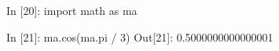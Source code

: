 \documentclass{magnolia}
\begin{document}
\begin{pythoncode}
In [20]: import math as ma

In [21]: ma.cos(ma.pi / 3)
Out[21]: 0.5000000000000001
\end{pythoncode}









\end{document}
